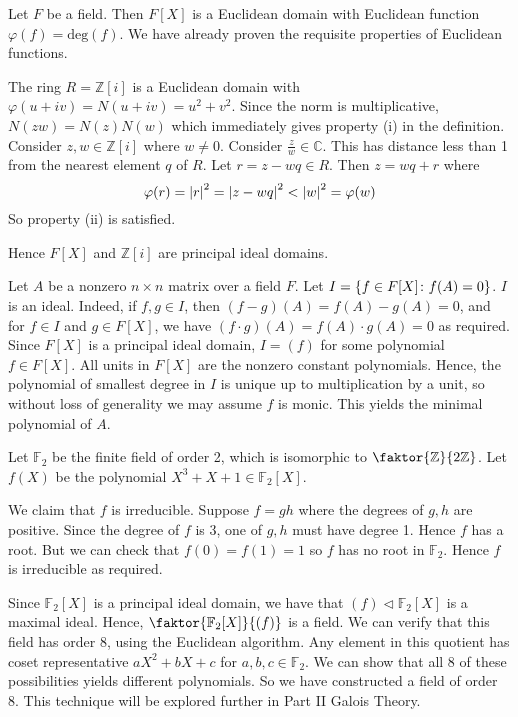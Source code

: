 \begin{example}
	Let \( F \) be a field.
	Then \( F[X] \) is a Euclidean domain with Euclidean function \( \varphi(f) = \mathrm{deg}(f) \).
	We have already proven the requisite properties of Euclidean functions.

	The ring \( R = \mathbb Z[i] \) is a Euclidean domain with \( \varphi(u+iv) = N(u+iv) = u^2+v^2 \).
	Since the norm is multiplicative, \( N(zw) = N(z)N(w) \) which immediately gives property (i) in the definition.
	Consider \( z, w \in \mathbb Z[i] \) where \( w \neq 0 \).
	Consider \( \frac{z}{w} \in \mathbb C \).
	This has distance less than 1 from the nearest element \( q \) of \( R \).
	Let \( r = z - w q \in R \).
	Then \( z = w q + r \) where
	\[
		\varphi(r) = \abs{r}^2 = \abs{z - w q}^2 < \abs{w}^2 = \varphi(w)
	\]
	So property (ii) is satisfied.

	Hence \( F[X] \) and \( \mathbb Z[i] \) are principal ideal domains.
\end{example}
\begin{example}
	Let \( A \) be a nonzero \( n \times n \) matrix over a field \( F \).
	Let \( I = \qty{f \in F[X] \colon f(A) = 0} \).
	\( I \) is an ideal.
	Indeed, if \( f, g \in I \), then \( (f-g)(A) = f(A) - g(A) = 0 \), and for \( f \in I \) and \( g \in F[X] \), we have \( (f \cdot g)(A) = f(A) \cdot g(A) = 0 \) as required.
	Since \( F[X] \) is a principal ideal domain, \( I = (f) \) for some polynomial \( f \in F[X] \).
	All units in \( F[X] \) are the nonzero constant polynomials.
	Hence, the polynomial of smallest degree in \( I \) is unique up to multiplication by a unit, so without loss of generality we may assume \( f \) is monic.
	This yields the minimal polynomial of \( A \).
\end{example}
\begin{example}
	Let \( \mathbb F_2 \) be the finite field of order 2, which is isomorphic to \( \faktor{\mathbb Z}{2 \mathbb Z} \).
	Let \( f(X) \) be the polynomial \( X^3 + X + 1 \in \mathbb F_2[X] \).

	We claim that \( f \) is irreducible.
	Suppose \( f = gh \) where the degrees of \( g, h \) are positive.
	Since the degree of \( f \) is 3, one of \( g, h \) must have degree 1.
	Hence \( f \) has a root.
	But we can check that \( f(0) = f(1) = 1 \) so \( f \) has no root in \( \mathbb F_2 \).
	Hence \( f \) is irreducible as required.

	Since \( \mathbb F_2[X] \) is a principal ideal domain, we have that \( (f) \triangleleft \mathbb F_2[X] \) is a maximal ideal.
	Hence, \( \faktor{\mathbb F_2[X]}{(f)} \) is a field.
	We can verify that this field has order 8, using the Euclidean algorithm.
	Any element in this quotient has coset representative \( aX^2 + bX + c \) for \( a,b,c \in \mathbb F_2 \).
	We can show that all 8 of these possibilities yields different polynomials.
	So we have constructed a field of order 8.
	This technique will be explored further in Part II Galois Theory.
\end{example}
